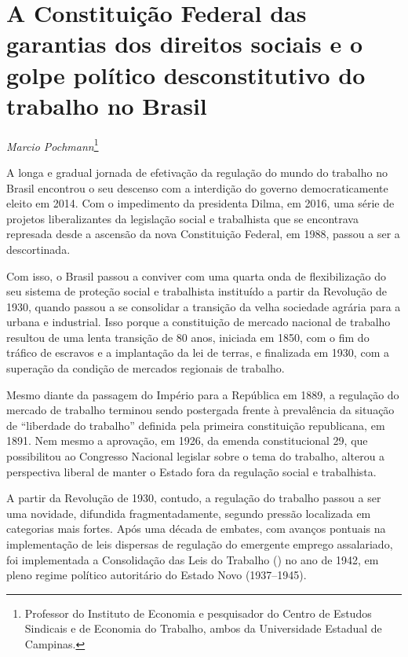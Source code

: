 \chapter*{A Constituição Federal das garantias dos direitos sociais e o
golpe político desconstitutivo do trabalho no Brasil}


\begin{flushright}
\emph{Marcio Pochmann}\footnote{Professor do Instituto de Economia e
  pesquisador do Centro de Estudos Sindicais e de Economia do Trabalho,
  ambos da Universidade Estadual de Campinas.}
\end{flushright}

A longa e gradual jornada de efetivação da regulação do mundo do
trabalho no Brasil encontrou o seu descenso com a interdição do governo
democraticamente eleito em 2014. Com o impedimento da presidenta Dilma,
em 2016, uma série de projetos liberalizantes da legislação social e
trabalhista que se encontrava represada desde a ascensão da nova
Constituição Federal, em 1988, passou a ser a descortinada.

Com isso, o Brasil passou a conviver com uma quarta onda de
flexibilização do seu sistema de proteção social e trabalhista
instituído a partir da Revolução de 1930, quando passou a se consolidar
a transição da velha sociedade agrária para a urbana e industrial. Isso
porque a constituição de mercado nacional de trabalho resultou de uma
lenta transição de 80 anos, iniciada em 1850, com o fim do tráfico de
escravos e a implantação da lei de terras, e finalizada em 1930, com a
superação da condição de mercados regionais de trabalho.

Mesmo diante da passagem do Império para a República em 1889, a
regulação do mercado de trabalho terminou sendo postergada frente à
prevalência da situação de ``liberdade do trabalho'' definida pela
primeira constituição republicana, em 1891. Nem mesmo a aprovação, em
1926, da emenda constitucional 29, que possibilitou ao Congresso
Nacional legislar sobre o tema do trabalho, alterou a perspectiva
liberal de manter o Estado fora da regulação social e trabalhista.

A partir da Revolução de 1930, contudo, a regulação do trabalho passou a
ser uma novidade, difundida fragmentadamente, segundo pressão localizada
em categorias mais fortes. Após uma década de embates, com avanços
pontuais na implementação de leis dispersas de regulação do emergente
emprego assalariado, foi implementada a Consolidação das Leis do
Trabalho () no ano de 1942, em pleno regime político autoritário do
Estado Novo (1937--1945).

